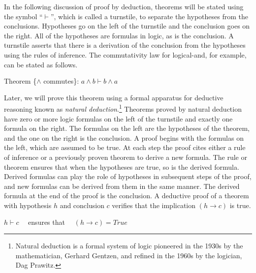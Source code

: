 In the following discussion of proof by deduction,
theorems will be stated using the symbol ``$\vdash$'',
which is called a turnstile,
to separate the hypotheses from the conclusions.
Hypotheses go on the left of the turnstile and the conclusion goes on the right.
All of the hypotheses are formulas in logic, as is the conclusion.
A turnstile asserts that there is a derivation of the conclusion
from the hypotheses using the rules of inference.
The commutativity law for logical-and, for example,
can be stated as follows.
\begin{center}
Theorem \{$\wedge$ commutes\}: $a \wedge b \vdash b \wedge a$
\end{center}

Later, we will prove this theorem using a formal apparatus
for deductive reasoning known as
\emph{natural deduction}.\footnote{Natural
deduction is a formal system of logic pioneered in the 1930s
by the mathematician, Gerhard Gentzen, and refined in the 1960s
by the logician, Dag Prawitz.}
Theorems proved by natural deduction have zero or more
logic formulas on the left of the turnstile and exactly one formula on the right.
The formulas on the left are the hypotheses of the theorem, and
the one on the right is the conclusion.
A proof begins with the formulas on the left,
which are assumed to be true.
At each step the proof cites either a rule of inference or a previously proven theorem
to derive a new formula. The rule or theorem ensures that when the hypotheses are true,
so is the derived formula. Derived formulas can play the role of hypotheses
in subsequent steps of the proof, and new formulas can be derived from them
in the same manner. The derived formula at the end of the proof is the conclusion.
A deductive proof of a theorem with hypothesis $h$ and conclusion $c$
verifies that the implication $(h \rightarrow c)$ is true.
\begin{center}
$h \vdash c$ ~~ensures that~~ $(h \rightarrow c) = True$
\end{center}


